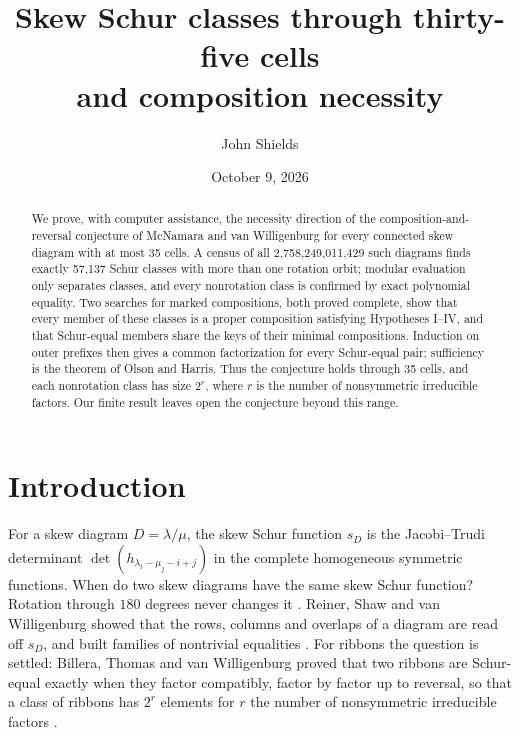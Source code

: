 \documentclass[11pt,a4paper]{amsart}
\title[Skew Schur classes through thirty-five cells]
{Skew Schur classes through thirty-five cells\\
and composition necessity}
\author{John Shields}
\date{October 9, 2026}
\numberwithin{equation}{section}
\theoremstyle{plain}
\theoremstyle{definition}
\begin{document}
\begin{abstract}
We prove, with computer assistance, the necessity direction of the composition-and-reversal conjecture of McNamara and van Willigenburg for every connected skew diagram with at most 35 cells.  A census of all 2,758,249,011,429 such diagrams finds exactly 57,137 Schur classes with more than one rotation orbit; modular evaluation only separates classes, and every nonrotation class is confirmed by exact polynomial equality.  Two searches for marked compositions, both proved complete, show that every member of these classes is a proper composition satisfying Hypotheses I--IV, and that Schur-equal members share the keys of their minimal compositions.  Induction on outer prefixes then gives a common factorization for every Schur-equal pair; sufficiency is the theorem of Olson and Harris.  Thus the conjecture holds through 35 cells, and each nonrotation class has size \(2^r\), where \(r\) is the number of nonsymmetric irreducible factors.  Our finite result leaves open the conjecture beyond this range.
\end{abstract}

\maketitle

\section{Introduction}\label{sec:introduction}

For a skew diagram \(D=\lambda/\mu\), the skew Schur function \(s_D\) is the Jacobi--Trudi determinant \(\det(h_{\lambda_i-\mu_j-i+j})\) in the complete homogeneous symmetric functions.  When do two skew diagrams have the same skew Schur function?  Rotation through \(180\) degrees never changes it \cite[Prop.~3.4]{McNamara2009Classification}.  Reiner, Shaw and van Willigenburg showed that the rows, columns and overlaps of a diagram are read off \(s_D\), and built families of nontrivial equalities \cite{Reiner2007Coincidences}.  For ribbons the question is settled: Billera, Thomas and van Willigenburg proved that two ribbons are Schur-equal exactly when they factor compatibly, factor by factor up to reversal, so that a class of ribbons has \(2^r\) elements for \(r\) the number of nonsymmetric irreducible factors \cite[Thm.~4.1]{Billera2006DecomposableCompositions}.
\end{document}
